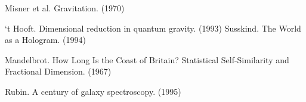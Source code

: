 \documentclass[12pt]{article}
\begin{document}
\begin{thebibliography}{9}

 Misner et al. Gravitation. (1970)

 `t Hooft. Dimensional reduction in quantum gravity. (1993)
 Susskind. The World as a Hologram. (1994)

 Mandelbrot. How Long Is the Coast of Britain? Statistical Self-Similarity and Fractional Dimension. (1967)

 Rubin. A century of galaxy spectroscopy. (1995) 





\end{thebibliography}
\end{document}
